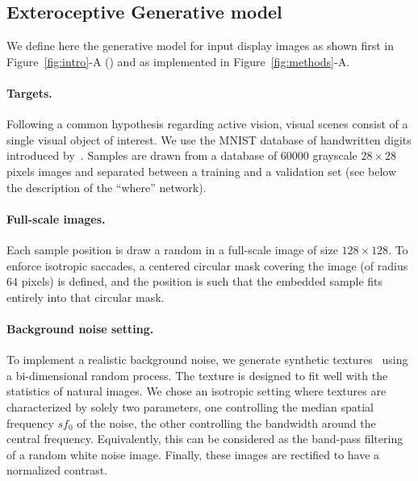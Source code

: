 

%
\subsection{Exteroceptive Generative model}
We define here the generative model for input display images as shown first in Figure~\ref{fig:intro}-A (\DIS ) and as implemented in Figure~\ref{fig:methods}-A.

\paragraph{Targets.} Following a common hypothesis regarding active vision, visual scenes consist of a single visual object of interest. We use the MNIST database of handwritten digits introduced by~\citep{Lecun1998}. %
Samples are drawn from a database of $60000$ grayscale $28\times 28$ pixels images and separated between a training and a validation set (see below the description of the ``where'' network).

\paragraph{Full-scale images.} Each sample position is draw a random in a full-scale image of size $128\times 128$. To enforce isotropic saccades, a centered circular mask covering the image (of radius $64$ pixels) is defined, and the position is such that the embedded sample fits entirely into that circular mask.

\paragraph{Background noise setting. } To implement a realistic background noise, we generate synthetic textures~\citep{Sanz12} using a bi-dimensional random process. %
The texture is designed to fit well with the statistics of natural images. We chose an isotropic setting where textures are characterized by solely two parameters, one controlling the median spatial frequency $sf_0$ of the noise, the other controlling the bandwidth around the central frequency. Equivalently, this can be considered as the band-pass filtering of a random white noise image. Finally, these images are rectified to have a normalized contrast.

